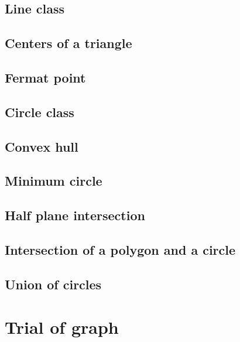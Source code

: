 \documentclass[UTF8,a4paper]{report}
\begin{document}
		\section{Line class}
			
		\section{Centers of a triangle}
			
		\section{Fermat point}
			
		\section{Circle class}
			
		\section{Convex hull}
			
		\section{Minimum circle}
			
		\section{Half plane intersection}
			
		\section{Intersection of a polygon and a circle}
			
		\section{Union of circles}	
			
	\chapter{Trial of graph}
\end{document}

